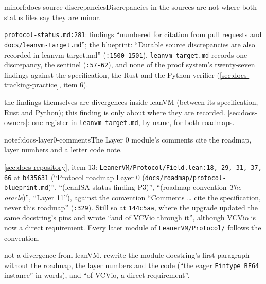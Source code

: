 \begin{finding}{minor}{f:docs-source-discrepancies}{Discrepancies in the sources are not where both status files say they are}
 minor.
 \begin{sloppypar}
\texttt{protocol-\allowbreak{}status.\allowbreak{}md:\allowbreak{}281}: findings ``numbered for citation from pull requests and \texttt{docs/\allowbreak{}leanvm-\allowbreak{}target.\allowbreak{}md}''; the blueprint: ``Durable source discrepancies are also recorded in leanvm-target.md'' (\texttt{:\allowbreak{}1500-\allowbreak{}1501}). \texttt{leanvm-\allowbreak{}target.\allowbreak{}md} records one discrepancy, the sentinel (\texttt{:\allowbreak{}57-\allowbreak{}62}), and none of the proof system's twenty-seven findings against the specification, the Rust and the Python verifier (\cref{sec:docs-tracking-practice}, item 6).
\end{sloppypar}
 the findings themselves are divergences inside leanVM (between its specification, Rust and Python); this finding is only about where they are recorded.
 \cref{sec:docs-owners}: one register in \texttt{leanvm-\allowbreak{}target.\allowbreak{}md}, by name, for both roadmaps.
\end{finding}

\begin{finding}{note}{f:docs-layer0-comments}{The Layer 0 module's comments cite the roadmap, layer numbers and a letter code}
 note.
 \begin{sloppypar}
\cref{sec:docs-repository}, item 13: \texttt{Leaner\allowbreak{}VM/\allowbreak{}Protocol/\allowbreak{}Field.\allowbreak{}lean:\allowbreak{}18,\allowbreak{} 29,\allowbreak{} 31,\allowbreak{} 37,\allowbreak{} 66} at \texttt{b435631} (``Protocol roadmap Layer 0 (\texttt{docs/\allowbreak{}roadmap/\allowbreak{}protocol-\allowbreak{}blueprint.\allowbreak{}md})'', ``(leanISA status finding P3)'', ``(roadmap convention \emph{The oracle})'', ``Layer 11''), against the convention ``Comments … cite the specification, never this roadmap'' (\texttt{:\allowbreak{}329}). Still so at \texttt{144c5aa}, where the upgrade updated the same docstring's pins and wrote ``and of VCVio through it'', although VCVio is now a direct requirement. Every later module of \texttt{Leaner\allowbreak{}VM/\allowbreak{}Protocol/\allowbreak{}} follows the convention.
\end{sloppypar}
 not a divergence from leanVM.
 rewrite the module docstring's first paragraph without the roadmap, the layer numbers and the code (``the eager \texttt{Fintype BF64} instance'' in words), and ``of VCVio, a direct requirement''.
\end{finding}

